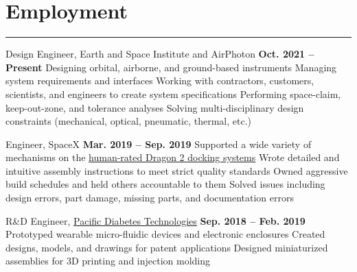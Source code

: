 \vfill
\section{Employment}
\noindent\rule{\textwidth}{\hlinewidth}

\begin{innerlist}
    \item Design Engineer, Earth and Space Institute and AirPhoton
		\hfill\textbf{Oct. 2021 -- Present}
        \subitem Designing orbital, airborne, and ground-based instruments
        \subitem Managing system requirements and interfaces
        \subitem Working with contractors, customers, scientists, and engineers to create system specifications
        \subitem Performing space-claim, keep-out-zone, and tolerance analyses 
        \subitem Solving multi-disciplinary design constraints (mechanical, optical, pneumatic, thermal, etc.)
	\item Engineer, SpaceX 
		\hfill\textbf{Mar. 2019 -- Sep. 2019}
		\subitem Supported a wide variety of mechanisms on the 
            \href{https://en.wikipedia.org/wiki/Dragon_2}{human-rated Dragon 2 docking systems}
		\subitem Wrote detailed and intuitive assembly instructions to meet strict quality standards
		\subitem Owned aggressive build schedules and held others accountable to them
		\subitem Solved issues including design errors, part damage, missing parts, and documentation errors
    \item R\&D Engineer, \href{http://pacificdt.com/}{Pacific Diabetes Technologies} 
		\hfill\textbf{Sep. 2018 -- Feb. 2019} %
        \subitem Prototyped wearable micro-fluidic devices and electronic enclosures
		\subitem Created designs, models, and drawings for patent applications
		\subitem Designed miniaturized assemblies for 3D printing and injection molding
\end{innerlist}

